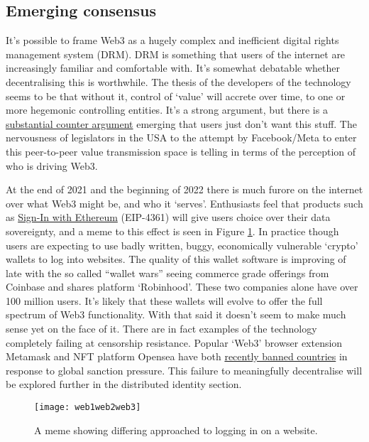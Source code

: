 \subsection{Emerging consensus}
It's possible to frame Web3 as a hugely complex and inefficient digital rights management system (DRM). DRM is something that users of the internet are increasingly familiar and comfortable with. It's somewhat debatable whether decentralising this is worthwhile. The thesis of the developers of the technology seems to be that without it, control of `value' will accrete over time, to one or more hegemonic controlling entities. It's a strong argument, but there is a \href{https://moxie.org/2022/01/07/web3-first-impressions.html}{substantial counter argument} emerging that users just don't want this stuff. The nervousness of legislators in the USA to the attempt by Facebook/Meta to enter this peer-to-peer value transmission space is telling in terms of the perception of who is driving Web3.\par
At the end of 2021 and the beginning of 2022 there is much furore on the internet over what Web3 might be, and who it `serves'. 
Enthusiasts feel that products such as \href{https://blog.spruceid.com/sign-in-with-ethereum-is-a-game-changer-part-1/}{Sign-In with Ethereum} (EIP-4361) will give users choice over their data sovereignty, and a meme to this effect is seen in Figure \ref{fig:web1web2web3}. In practice though users are expecting to use badly written, buggy, economically vulnerable `crypto' wallets to log into websites. The quality of this wallet software is improving of late with the so called ``wallet wars'' seeing commerce grade offerings from Coinbase and shares platform `Robinhood'. These two companies alone have over 100 million users. It's likely that these wallets will evolve to offer the full spectrum of Web3 functionality. With that said it doesn't seem to make much sense yet on the face of it. There are in fact examples of the technology completely failing at censorship resistance. Popular `Web3' browser extension Metamask and NFT platform Opensea have both \href{https://www.forbes.com/sites/stevenehrlich/2022/03/03/iranian-venezuela-users-abruptly-dropped-from-major-crypto-platforms-as-russian-sanctions-grow/?sh=22bcabc470b0}{recently banned countries} in response to global sanction pressure. This failure to meaningfully decentralise will be explored further in the distributed identity section. \par
\begin{figure}
  \centering
   \texttt{[image: web1web2web3]}
 \caption{A meme showing differing approached to logging in on a website.}
 \label{fig:web1web2web3}
\end{figure}
